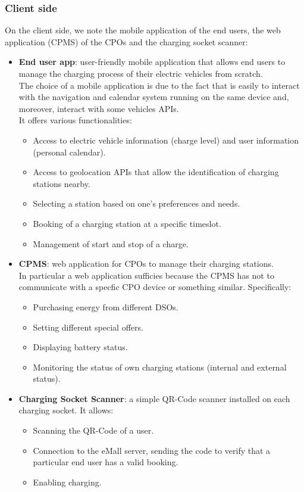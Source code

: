 \subsubsection{Client side}
On the client side, we note the mobile application of the end users, the web application (CPMS) of the CPOs and the charging socket scanner:
\begin{itemize}
    \item \textbf{End user app}: user-friendly mobile application that allows end users to manage the charging process of their electric vehicles from scratch.\\
    The choice of a mobile application is due to the fact that is easily to interact with the navigation and calendar system running on the same device and, moreover, interact with some vehicles APIs.\\
    It offers various functionalities:
    \begin{itemize}
        \item Access to electric vehicle information (charge level) and user information (personal calendar).
        \item Access to geolocation APIs that allow the identification of charging stations nearby.
        \item Selecting a station based on one's preferences and needs.
        \item Booking of a charging station at a specific timeslot.
        \item Management of start and stop of a charge.
    \end{itemize}
    \item \textbf{CPMS}: web application for CPOs to manage their charging stations. \\
    In particular a web application sufficies because the CPMS has not to communicate with a specfic CPO device or something similar.
    Specifically:
    \begin{itemize}
        \item Purchasing energy from different DSOs.
        \item Setting different special offers.
        \item Displaying battery status.
        \item Monitoring the status of own charging stations (internal and external status).
    \end{itemize}
    \item \textbf{Charging Socket Scanner}: a simple QR-Code scanner installed on each charging socket. It allows:
    \begin{itemize}
        \item Scanning the QR-Code of a user.
        \item Connection to the eMall server, sending the code to verify that a particular end user has a valid booking.
        \item Enabling charging.
    \end{itemize}
\end{itemize}

